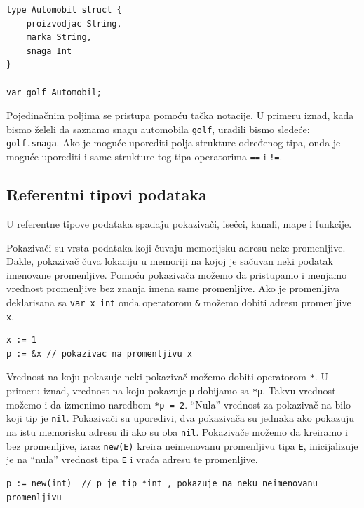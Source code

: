 \documentclass[a4paper]{article}
\begin{document}
\begin{lstlisting}[caption={Definicija strukture},frame=single, label=Definicija_strukture]
type Automobil struct {
	proizvodjac String,
	marka String,
	snaga Int	
}

var golf Automobil;
\end{lstlisting}

Pojedinačnim poljima se pristupa pomoću tačka notacije. U primeru iznad, kada bismo želeli da saznamo snagu automobila \texttt{golf}, uradili bismo sledeće: \texttt{golf.snaga}.
Ako je moguće uporediti polja strukture određenog tipa, onda je moguće uporediti i same strukture tog tipa operatorima \texttt{==} i \texttt{!=}.


\subsection{Referentni tipovi podataka}
\label{subsec:referentni_tipovi}


U referentne tipove podataka spadaju pokazivači, isečci, kanali, mape i  funkcije.

Pokazivači su vrsta podataka koji čuvaju memorijsku adresu neke promenljive. Dakle, pokazivač čuva lokaciju u memoriji na kojoj je sačuvan neki podatak imenovane promenljive. Pomoću pokazivača možemo da pristupamo i menjamo  vrednost promenljive bez znanja imena same promenljive. Ako je promenljiva deklarisana sa \texttt{var x int} onda operatorom \texttt{\&} možemo dobiti adresu promenljive \texttt{x}.

\begin{lstlisting}[caption={Primer pokazivača},frame=single, label=Primer_pokazivaca]
x := 1
p := &x // pokazivac na promenljivu x
\end{lstlisting}

Vrednost na koju pokazuje neki pokazivač možemo dobiti operatorom \texttt{*}. U primeru iznad, vrednost na koju pokazuje \texttt{p} dobijamo sa \texttt{*p}. Takvu vrednost možemo i da izmenimo naredbom \texttt{*p = 2}.
“Nula” vrednost za pokazivač na bilo koji tip je \texttt{nil}. Pokazivači su uporedivi, dva pokazivača su jednaka ako pokazuju na istu memorisku adresu ili ako su oba \texttt{nil}.
Pokazivače možemo da kreiramo i bez promenljive, izraz \texttt{new(E)} kreira neimenovanu promenljivu tipa \texttt{E}, inicijalizuje je na “nula” vrednost tipa \texttt{E} i vraća adresu te promenljive.

\begin{lstlisting}[caption={Primer kreiranja pokazivača},frame=single, label=Primer_kreiranje_pokazivaca]
p := new(int)  // p je tip *int , pokazuje na neku neimenovanu promenljivu
\end{lstlisting}
\end{document}
